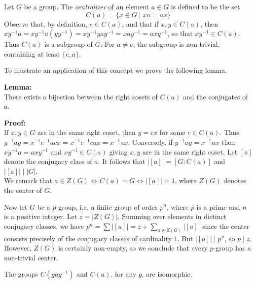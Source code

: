 \documentclass[12pt]{article}
\begin{document}
Let $G$ be a group.  The {\em centralizer} of an element $a \in G$ is defined to be the set $$C(a) = \{x \in G \mid xa = ax\}$$
Observe that, by definition, $e \in C(a)$, and that if $x, y \in C(a)$, then $xy^{-1}a = xy^{-1}a(yy^{-1})=xy^{-1}yay^{-1}=xay^{-1} = axy^{-1}$, so that $xy^{-1} \in C(a)$. Thus $C(a)$ is a subgroup of $G$.  For $a \neq e$, the subgroup is non-trivial, containing at least $\{e, a\}$.

To illustrate an application of this concept we prove the following lemma.

{\bf Lemma:}\\
There exists a bijection between the right cosets of $C(a)$ and the conjugates of $a$.

{\bf Proof:}\\
If $x,y \in G$ are in the same right coset, then $y = cx$ for some $c \in C(a)$. Thus $y^{-1}ay = x^{-1}c^{-1}acx = x^{-1}c^{-1}cax = x^{-1}ax$.
Conversely, if $y^{-1}ay = x^{-1}ax$ then $xy^{-1}a = axy^{-1}$ and $xy^{-1} \in C(a)$ giving $x,y$ are in the same right coset.
Let $[a]$ denote the conjugacy class of $a$. It follows that $|[a]| = [G : C(a)]$ and  $|[a]| \mid |G|$.\\

We remark that $a \in Z(G) \iff C(a) = G \iff |[a]| = 1$, where $Z(G)$ denotes the center of $G$.

Now let $G$ be a $p$-group, i.e. a finite group of order $p^n$,
where $p$ is a prime and $n$ is a positive integer.
Let $z = |Z(G)|$.
Summing over elements in distinct conjugacy classes,
we have $p^n = \sum{|[a]|} = z + \sum_{a \notin Z(G)}{|[a]|}$
since the center consists precisely of the conjugacy classes of
cardinality $1$.
But $|[a]| \mid p^n$, so $p \mid z$.
However, $Z(G)$ is certainly non-empty, so we conclude that every
$p$-group has a non-trivial center.

The groups $C(gag^{-1})$ and $C(a)$, for any $g$, are isomorphic.
\end{document}
